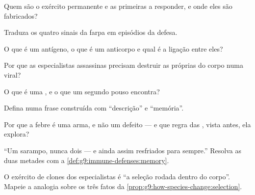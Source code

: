 \begin{exercise}[$\star$]\label{exo:g9:immune-defenses:1}
Quem são o exército permanente e as primeiras a responder, e
onde eles são fabricados?
\end{exercise}

\begin{exercise}[$\star$]\label{exo:g9:immune-defenses:2}
Traduza os quatro sinais da farpa em episódios da defesa.
\end{exercise}

\begin{exercise}[$\star$]\label{exo:g9:immune-defenses:3}
O que é um antígeno, o que é um anticorpo e qual é a ligação
entre eles?
\end{exercise}

\begin{exercise}[$\star$]\label{exo:g9:immune-defenses:4}
Por que as especialistas assassinas precisam destruir as
próprias  do corpo numa  viral?
\end{exercise}

\begin{exercise}[$\star$]\label{exo:g9:immune-defenses:5}
O que é uma , e o que um segundo pouso
encontra?
\end{exercise}

\begin{exercise}[$\star$]\label{exo:g9:immune-defenses:6}
Defina  numa frase construída com ``descrição'' e
``memória''.
\end{exercise}

\begin{exercise}[$\star\star$]\label{exo:g9:immune-defenses:7}
Por que a febre é uma arma, e não um defeito --- e que regra
das , vista antes, ela explora?
\end{exercise}

\begin{exercise}[$\star\star$]\label{exo:g9:immune-defenses:8}
``Um sarampo, nunca dois --- e ainda assim resfriados para
sempre.'' Resolva as duas metades com a
\cref{def:g9:immune-defenses:memory}.
\end{exercise}

\begin{exercise}[$\star\star$]\label{exo:g9:immune-defenses:9}
O exército de clones dos especialistas é ``a seleção rodada
dentro do corpo''. Mapeie a analogia sobre os três fatos da
\cref{prop:g9:how-species-change:selection}.
\end{exercise}

